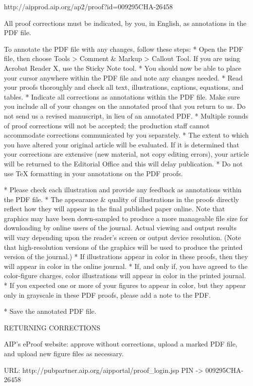 http://aipprod.aip.org/ap2/proof?id=009295CHA-26458

All proof corrections must be indicated, by you, in English, as
annotations in the PDF file.

To annotate the PDF file with any changes, follow these steps:
      * Open the PDF file, then choose
        Tools > Comment & Markup > Callout Tool.
        If you are using Acrobat Reader X, use the Sticky Note tool.
      * You should now be able to place your cursor anywhere within the
        PDF file and note any changes needed.
      * Read your proofs thoroughly and check all text, illustrations,
        captions, equations, and tables.
      * Indicate all corrections as annotations within the PDF file. Make
        sure you include all of your changes on the annotated proof that
        you return to us. Do not send us a revised manuscript, in lieu of
        an annotated PDF.
      * Multiple rounds of proof corrections will not be accepted; the
        production staff cannot accommodate corrections communicated by you
        separately.
      * The extent to which you have altered your original article will
        be evaluated. If it is determined that your corrections are
        extensive (new material, not copy editing errors), your article
        will be returned to the Editorial Office and this will delay
        publication.
      * Do not use TeX formatting in your annotations on the PDF proofs.

      * Please check each illustration and provide any feedback as
        annotations within the PDF file.
      * The appearance & quality of illustrations in the proofs directly
        reflect how they will appear in the final published paper online.
        Note that graphics may have been down-sampled to produce a more
        manageable file size for downloading by online users of the
        journal.  Actual viewing and output results will vary depending
        upon the reader's screen or output device resolution.  (Note that
        high-resolution versions of the graphics will be used to produce
        the printed version of the journal.)
      * If illustrations appear in color in these proofs, then they will
        appear in color in the online journal.
      * If, and only if, you have agreed to the color-figure charges,
        color illustrations will appear in color in the printed journal.
      * If you expected one or more of your figures to appear in color,
        but they appear only in grayscale in these PDF proofs, please add a
        note to the PDF.

      * Save the annotated PDF file.

RETURNING CORRECTIONS

      AIP's eProof
      website:  approve without corrections,
      upload a marked PDF file, and upload new figure files as necessary.

      URL: http://pubpartner.aip.org/aipportal/proof_login.jsp
      PIN -> 009295CHA-26458
